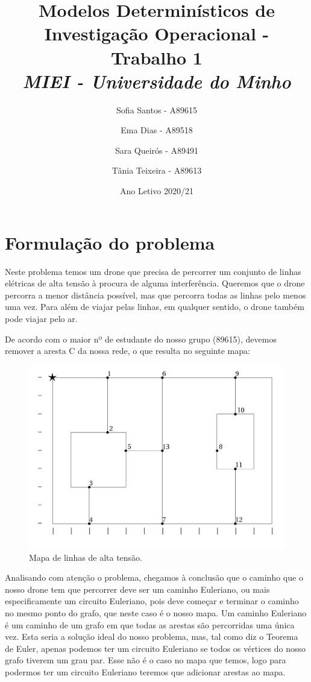 \documentclass{article}
\begin{document}
\title{Modelos Determinísticos de Investigação Operacional - Trabalho 1\\
    \large\emph{MIEI - Universidade do Minho}}
\author{Sofia Santos - A89615 \and Ema Dias - A89518 \and
    Sara Queirós - A89491 \and Tânia Teixeira - A89613}

\date{Ano Letivo 2020/21}    

\maketitle

\newpage

\section{Formulação do problema}

Neste problema temos um drone que precisa de percorrer um conjunto de linhas elétricas de alta tensão à procura de alguma interferência. Queremos que o drone percorra a menor distância possível, mas que percorra todas as linhas pelo menos uma vez. Para além de viajar pelas linhas, em qualquer sentido, o drone também pode viajar pelo ar.

De acordo com o maior nº de estudante do nosso grupo (89615), devemos remover a aresta C da nossa rede, o que resulta no seguinte mapa:

\begin{figure}[h]
    \centering
    \includegraphics[width=0.8\linewidth]{fig1.png}
    \caption{Mapa de linhas de alta tensão.}
    \label{fig:mapa}
\end{figure}

Analisando com atenção o problema, chegamos à conclusão que o caminho que o nosso drone tem que percorrer deve ser um caminho Euleriano, ou mais especificamente um circuito Euleriano, pois deve começar e terminar o caminho no mesmo ponto do grafo, que neste caso é o nosso mapa. Um caminho Euleriano é um caminho de um grafo em que todas as arestas são percorridas uma única vez. Esta seria a solução ideal do nosso problema, mas, tal como diz o Teorema de Euler, apenas podemos ter um circuito Euleriano se todos os vértices do nosso grafo tiverem um grau par. Esse não é o caso no mapa que temos, logo para podermos ter um circuito Euleriano teremos que adicionar arestas ao mapa.
\end{document}
